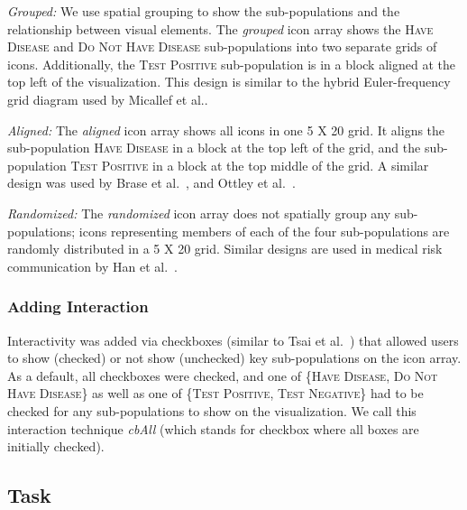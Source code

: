 \begin{compacthang}
	\item \textit{Grouped: }We use spatial grouping to show the sub-populations and the relationship between visual elements. The \textit{grouped} icon array shows the \textsc{Have Disease} and \textsc{Do Not Have Disease} sub-populations into two separate grids of icons. Additionally, the \textsc{Test Positive} sub-population is in a block aligned at the top left of the visualization. This design is similar to the hybrid Euler-frequency grid diagram used by Micallef et al.\cite{micallef2012Assessing}. 
	
	\item \textit{Aligned: }The \textit{aligned} icon array shows all icons in one 5 X 20 grid. It aligns the sub-population \textsc{Have Disease} in a block at the top left of the grid, and the sub-population \textsc{Test Positive} in a block at the top middle of the grid. A similar design was used by Brase et al.~\cite{brase2009Pictorial}, and Ottley et al.~\cite{ottley2016Bayesian,ottley2019Curious}.
	
	\item \textit{Randomized: }The \textit{randomized} icon array does not spatially group any sub-populations; icons representing members of each of the four  sub-populations are randomly distributed in a 5 X 20 grid. Similar designs are used in medical risk communication by Han et al.~\cite{han2011Representing}.
\end{compacthang}


\subsubsection{Adding Interaction}
Interactivity was added via checkboxes (similar to Tsai et al.~\cite{tsai2011Interactive}) that allowed users to show (checked) or not show (unchecked) key sub-populations on the icon array. As a default, all checkboxes were checked, and one of \{\textsc{Have Disease}, \textsc{Do Not Have Disease}\} as well as one of \{\textsc{Test Positive}, \textsc{Test Negative}\} had to be checked for any sub-populations to show on the visualization. We call this interaction technique \textit{cbAll} (which stands for checkbox where all boxes are initially checked). 

\subsection{Task}
\label{sec:questions}

